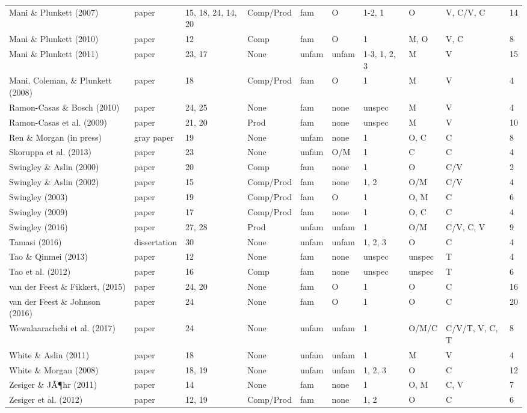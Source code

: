 \documentclass[man]{apa6}
\newenvironment{lltable}{\begin{landscape}\begin{center}\begin{ThreePartTable}}{\end{ThreePartTable}\end{center}\end{landscape}}
\begin{document}
\begin{lltable}
{\begin{longtable}{llllllllll}
Mani \& Plunkett (2007) & paper & 15, 18, 24, 14, 20 & Comp/Prod & fam & O & 1-2, 1 & O & V, C/V, C & 14\\
Mani \& Plunkett (2010) & paper & 12 & Comp & fam & O & 1 & M, O & V, C & 8\\
Mani \& Plunkett (2011) & paper & 23, 17 & None & unfam & unfam & 1-3, 1, 2, 3 & M & V & 15\\
Mani, Coleman, \& Plunkett (2008) & paper & 18 & Comp/Prod & fam & O & 1 & M & V & 4\\
Ramon-Casas \& Bosch (2010) & paper & 24, 25 & None & fam & none & unspec & M & V & 4\\
Ramon-Casas et al. (2009) & paper & 21, 20 & Prod & fam & none & unspec & M & V & 10\\
Ren \& Morgan (in press) & gray paper & 19 & None & unfam & none & 1 & O, C & C & 8\\
Skoruppa et al. (2013) & paper & 23 & None & unfam & O/M & 1 & C & C & 4\\
Swingley \& Aslin (2000) & paper & 20 & Comp & fam & none & 1 & O & C/V & 2\\
Swingley \& Aslin (2002) & paper & 15 & Comp/Prod & fam & none & 1, 2 & O/M & C/V & 4\\
Swingley (2003) & paper & 19 & Comp/Prod & fam & O & 1 & O, M & C & 6\\
Swingley (2009) & paper & 17 & Comp/Prod & fam & none & 1 & O, C & C & 4\\
Swingley (2016) & paper & 27, 28 & Prod & unfam & unfam & 1 & O/M & C/V, C, V & 9\\
Tamasi (2016) & dissertation & 30 & None & unfam & unfam & 1, 2, 3 & O & C & 4\\
Tao \& Qinmei (2013) & paper & 12 & None & fam & none & unspec & unspec & T & 4\\
Tao et al. (2012) & paper & 16 & Comp & fam & none & unspec & unspec & T & 6\\
van der Feest \& Fikkert, (2015) & paper & 24, 20 & None & fam & O & 1 & O & C & 16\\
van der Feest \& Johnson (2016) & paper & 24 & None & fam & O & 1 & O & C & 20\\
Wewalaarachchi et al. (2017) & paper & 24 & None & unfam & unfam & 1 & O/M/C & C/V/T, V, C, T & 8\\
White \& Aslin (2011) & paper & 18 & None & unfam & unfam & 1 & M & V & 4\\
White \& Morgan (2008) & paper & 18, 19 & None & unfam & unfam & 1, 2, 3 & O & C & 12\\
Zesiger \& JÃ¶hr (2011) & paper & 14 & None & fam & none & 1 & O, M & C, V & 7\\
Zesiger et al. (2012) & paper & 12, 19 & Comp/Prod & fam & none & 1, 2 & O & C & 6\\
\bottomrule
\end{longtable}
}
\end{lltable}
\end{document}
